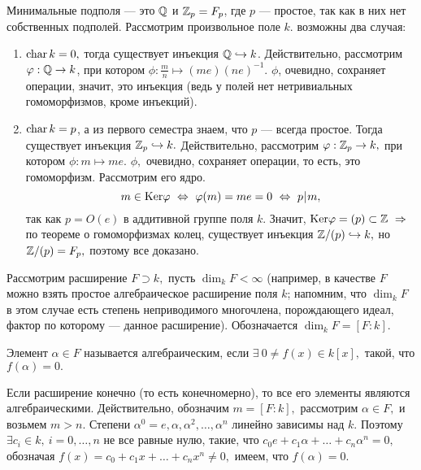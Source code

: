 Минимальные подполя --- это $\mathbb Q$ и $\mathbb Z_p=F_p$, где $p$ --- простое, так как в них нет собственных подполей.
Рассмотрим произвольное поле $k$. возможны два случая:
\begin{enumerate}
    \item ${\rm char}\,k=0,$ тогда существует инъекция $\mathbb Q\hookrightarrow k$. Действительно, рассмотрим $\varphi : \mathbb Q\rightarrow k$, при котором $\phi : \frac mn\mapsto (me)(ne)^{-1}.$
    $\phi$, очевидно, сохраняет операции, значит, это инъекция (ведь у полей нет нетривиальных гомоморфизмов, кроме инъекций).
    \item ${\rm char\,}k=p$, а из первого семестра знаем, что $p$ --- всегда простое. Тогда существует инъекция $\mathbb Z_p\hookrightarrow k.$ Действительно, рассмотрим $\varphi : \mathbb Z_p\rightarrow k,$ при котором $\phi : m\mapsto me.$
    $\phi,$ очевидно, сохраняет операции, то есть, это гомоморфизм. Рассмотрим его ядро. $$m\in\rr{Ker}\phi\lra\phi(m)=me=0\lra p\,\vrule\, m,$$ так как $p=O(e)$ в аддитивной группе поля $k$.
    Значит, ${\rm Ker}\varphi=(p)\subset \mathbb Z\ \Rightarrow\ $ по теореме о гомоморфизмах колец, существует инъекция $\mathbb Z/(p)\hookrightarrow k,$ но $\mathbb Z/(p)=F_p,$ поэтому все доказано.
\end{enumerate}

Рассмотрим расширение $F\supset k,$ пусть $\dim_kF<\infty$ (например, в качестве $F$ можно взять простое алгебраическое расширение поля $k$; напомним, что $\dim_kF$ в этом случае есть
степень неприводимого многочлена, порождающего идеал, фактор по которому --- данное расширение).
Обозначается $\dim_kF=[F:k].$

\de Элемент $\alpha\in F$ называется алгебраическим, если $\exists\  0\ne f(x)\in k[x],$ такой, что $f(\alpha)=0.$

Если расширение конечно (то есть конечномерно), то все его элементы являются алгебраическими.
Действительно, обозначим $m=[F:k],$ рассмотрим $\alpha\in F,$ и возьмем $m>n.$ Степени $\alpha^0=e,\alpha,\alpha^2,\dots,\alpha^n$ линейно зависимы над $k$.
Поэтому $\exists c_i\in k,\ i=0,\dots, n$ не все равные нулю, такие, что $c_0e+c_1\alpha+\dots+c_n\alpha^n=0,$ обозначая $f(x)=c_0+c_1x+\dots+c_nx^n\ne 0,$ имеем, что $f(\alpha)=0.$


